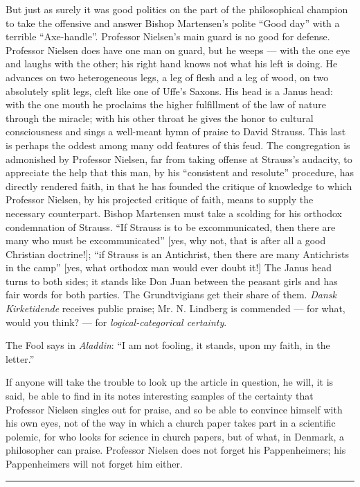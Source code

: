 \documentclass[12pt,a4paper,openany]{book}
\newcommand{\piecerule}{\par\begin{center}\rule{1.5cm}{0.4pt}\end{center}\par}
\newcommand{\opage}[1]{\marginnote{\footnotesize\textit{[#1]}}}
\begin{document}
But just as surely it was good politics on the part of the philosophical
champion to take the offensive and answer Bishop Martensen's polite
``Good day'' with a terrible ``Axe-handle''. Professor Nielsen's %
main guard is no good for defense. Professor Nielsen does have one man
on guard, but he weeps --- with the one eye and laughs with the other;
his right hand knows not what his left is doing. He advances on two
heterogeneous legs, a leg of flesh and a leg of wood, on two absolutely
split legs, cleft like one of Uffe's Saxons. His head is a Janus head: %
with the one mouth he proclaims the higher fulfillment of the law of
nature through the miracle; with his other throat he gives the honor
to cultural consciousness and sings a well-meant hymn of praise to
David Strauss. This last is perhaps the oddest among many odd features
of this feud. The congregation is admonished by Professor Nielsen, far
from taking offense at Strauss's audacity, to appreciate the help that
this man, by his ``consistent and resolute'' procedure, has directly
rendered faith, in that he has founded the critique of knowledge to
which Professor Nielsen, by his projected critique of faith, means to
supply the necessary counterpart. Bishop Martensen must take a scolding
for his orthodox condemnation of Strauss. ``If Strauss is to be
excommunicated, then there are many who must be excommunicated'' [yes,
why not, that is after all a good Christian doctrine!]; ``if Strauss is
an Antichrist, then there are many Antichrists in the camp'' [yes, what
orthodox man would ever doubt it!] The Janus head turns to both sides;
it stands like Don Juan between the peasant girls and has fair words for
\opage{92}both parties. The Grundtvigians get their share of them. \emph{Dansk
Kirketidende} receives public praise; Mr. N. Lindberg is commended ---
for what, would you think? --- for \emph{logical-categorical certainty}.

The Fool says in \emph{Aladdin}: ``I am not fooling, it stands, upon my faith,
in the letter.''

If anyone will take the trouble to look up the article in
question, he will, it is said, be able to find in its notes interesting
samples of the certainty that Professor Nielsen singles out for praise,
and so be able to convince himself with his own eyes, not of the way in
which a church paper takes part in a scientific polemic, for who looks
for science in church papers, but of what, in Denmark, a philosopher
can praise. Professor Nielsen does not forget his Pappenheimers; his
Pappenheimers will not forget him either.
\piecerule
\end{document}
